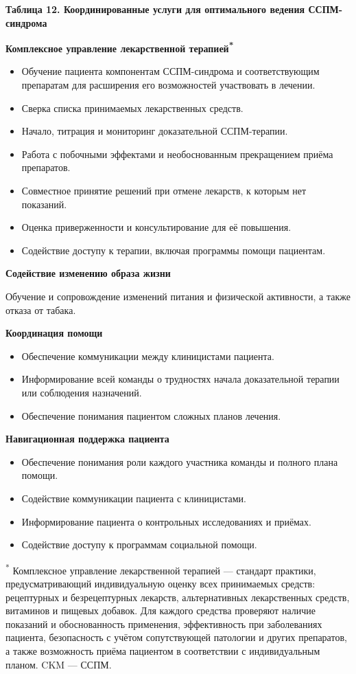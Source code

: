 \documentclass[11pt,a4paper]{article}
\newcommand{\heading}[1]{\par\medskip\textbf{#1}\par}
\begin{document}
\heading{Таблица 12. Координированные услуги для оптимального ведения ССПМ-синдрома}
\heading{Комплексное управление лекарственной терапией\textsuperscript{*}}
\begin{itemize}
\item Обучение пациента компонентам ССПМ-синдрома и соответствующим препаратам для расширения его возможностей участвовать в лечении.
\item Сверка списка принимаемых лекарственных средств.
\item Начало, титрация и мониторинг доказательной ССПМ-терапии.
\item Работа с побочными эффектами и необоснованным прекращением приёма препаратов.
\item Совместное принятие решений при отмене лекарств, к которым нет показаний.
\item Оценка приверженности и консультирование для её повышения.
\item Содействие доступу к терапии, включая программы помощи пациентам.
\end{itemize}
\heading{Содействие изменению образа жизни}
Обучение и сопровождение изменений питания и физической активности, а также отказа от табака.
\heading{Координация помощи}
\begin{itemize}
\item Обеспечение коммуникации между клиницистами пациента.
\item Информирование всей команды о трудностях начала доказательной терапии или соблюдения назначений.
\item Обеспечение понимания пациентом сложных планов лечения.
\end{itemize}
\heading{Навигационная поддержка пациента}
\begin{itemize}
\item Обеспечение понимания роли каждого участника команды и полного плана помощи.
\item Содействие коммуникации пациента с клиницистами.
\item Информирование пациента о контрольных исследованиях и приёмах.
\item Содействие доступу к программам социальной помощи.
\end{itemize}
\textsuperscript{*} Комплексное управление лекарственной терапией --- стандарт практики, предусматривающий индивидуальную оценку всех принимаемых средств: рецептурных и безрецептурных лекарств, альтернативных лекарственных средств, витаминов и пищевых добавок. Для каждого средства проверяют наличие показаний и обоснованность применения, эффективность при заболеваниях пациента, безопасность с учётом сопутствующей патологии и других препаратов, а также возможность приёма пациентом в соответствии с индивидуальным планом. CKM --- ССПМ.
\end{document}
